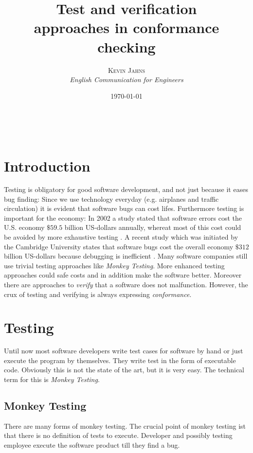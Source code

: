\documentclass[a4paper, 12pt]{article} %
\title{\textbf{Test and verification}\\ %
approaches in conformance checking} %
\author{\textsc{Kevin Jahns} %
\\{\textit{English Communication for Engineers}}} %
\date{\today} %
\makeatletter
\renewcommand{\maketitle}{ %
\begin{flushright} %
{\LARGE\@title} %

\vspace{50pt} %

{\large\@author} %
\\\@date %

\vspace{40pt} %
\end{flushright}
}
\makeatother
\begin{document}
\maketitle %


\section*{Introduction}
Testing is obligatory for good software development, and not just because it
eases bug finding: Since we use technology everyday (e.g. airplanes and traffic
circulation) it is evident that software bugs can cost lifes. Furthermore
testing is important for the economy: In 2002 a study stated that software errors cost the U.S.
economy $ \$59.5$ billion US-dollars annually, whereat most of this cost could
be avoided by more exhaustive testing \cite{nist}. A recent study which was
initiated by the Cambridge University states that software bugs cost the 
overall economy $ \$ 312 $  billion US-dollars because debugging is inefficient
\cite{cambridge_errors}.
Many software companies still use trivial testing approaches like
\textit{Monkey Testing}. More enhanced testing approaches could safe costs and 
in addition make the software better. Moreover there are approaches to
\textit{verify} that a software does not malfunction. However, the crux of
testing and verifying is always expressing \textit{conformance}. 

\section*{Testing}
Until now most software developers write test cases for software by hand or just
execute the program by themselves. They write test in the form of executable
code. Obviously this is not the state of the art, but it is very easy. The
technical term for this is \textit{Monkey Testing}.

\subsection*{Monkey Testing}
There are many forms of monkey testing. The crucial point of monkey testing ist
that there is no definition of tests to execute. Developer and possibly testing
employee execute the software product till they find a bug. 
\end{document}
